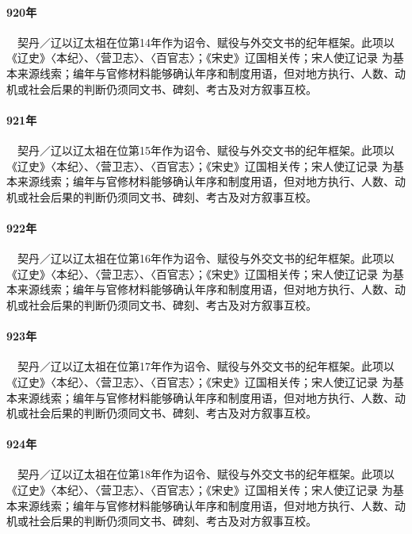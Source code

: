 \paragraph{920年}　契丹／辽以辽太祖在位第14年作为诏令、赋役与外交文书的纪年框架。此项以《辽史》〈本纪〉、〈营卫志〉、〈百官志〉；《宋史》辽国相关传；宋人使辽记录 为基本来源线索；编年与官修材料能够确认年序和制度用语，但对地方执行、人数、动机或社会后果的判断仍须同文书、碑刻、考古及对方叙事互校。

\paragraph{921年}　契丹／辽以辽太祖在位第15年作为诏令、赋役与外交文书的纪年框架。此项以《辽史》〈本纪〉、〈营卫志〉、〈百官志〉；《宋史》辽国相关传；宋人使辽记录 为基本来源线索；编年与官修材料能够确认年序和制度用语，但对地方执行、人数、动机或社会后果的判断仍须同文书、碑刻、考古及对方叙事互校。

\paragraph{922年}　契丹／辽以辽太祖在位第16年作为诏令、赋役与外交文书的纪年框架。此项以《辽史》〈本纪〉、〈营卫志〉、〈百官志〉；《宋史》辽国相关传；宋人使辽记录 为基本来源线索；编年与官修材料能够确认年序和制度用语，但对地方执行、人数、动机或社会后果的判断仍须同文书、碑刻、考古及对方叙事互校。

\paragraph{923年}　契丹／辽以辽太祖在位第17年作为诏令、赋役与外交文书的纪年框架。此项以《辽史》〈本纪〉、〈营卫志〉、〈百官志〉；《宋史》辽国相关传；宋人使辽记录 为基本来源线索；编年与官修材料能够确认年序和制度用语，但对地方执行、人数、动机或社会后果的判断仍须同文书、碑刻、考古及对方叙事互校。

\paragraph{924年}　契丹／辽以辽太祖在位第18年作为诏令、赋役与外交文书的纪年框架。此项以《辽史》〈本纪〉、〈营卫志〉、〈百官志〉；《宋史》辽国相关传；宋人使辽记录 为基本来源线索；编年与官修材料能够确认年序和制度用语，但对地方执行、人数、动机或社会后果的判断仍须同文书、碑刻、考古及对方叙事互校。

